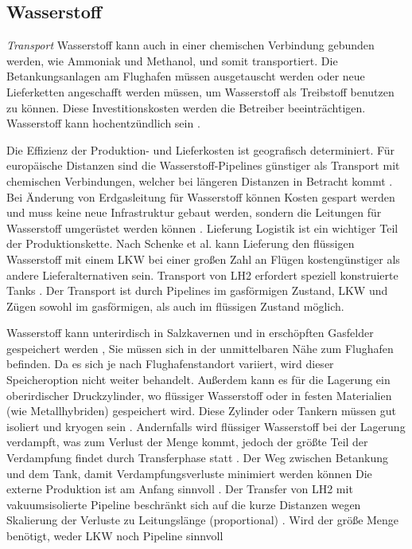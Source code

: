\subsection{Wasserstoff}
\textit{Transport}
Wasserstoff kann auch in einer chemischen Verbindung gebunden werden, wie Ammoniak und Methanol, und somit transportiert.
%
Die Betankungsanlagen am Flughafen müssen ausgetauscht werden oder neue Lieferketten angeschafft werden müssen, 
um Wasserstoff als Treibstoff benutzen zu können.
Diese Investitionskosten werden die Betreiber beeinträchtigen. 
Wasserstoff kann hochentzündlich sein \cite{dalmia2022powering}. %

% 
Die Effizienz der Produktion- und Lieferkosten ist geografisch determiniert. 
Für europäische Distanzen sind die Wasserstoff-Pipelines günstiger als Transport mit chemischen Verbindungen, 
welcher bei längeren Distanzen in Betracht kommt \cite{undertaking2022strategic}. Bei Änderung von Erdgasleitung für Wasserstoff können Kosten gespart
werden und muss keine neue Infrastruktur gebaut werden, sondern die Leitungen für Wasserstoff umgerüstet werden können \cite{undertaking2022strategic}.
Lieferung
Logistik ist ein wichtiger Teil der Produktionskette. Nach Schenke et al. \cite{schenke2024lh2} kann Lieferung den flüssigen Wasserstoff mit einem LKW bei einer großen Zahl an Flügen 
kostengünstiger als andere Lieferalternativen sein. Transport von LH2 erfordert speziell konstruierte Tanks \cite{mulder2019outlook}.
Der Transport ist durch Pipelines im gasförmigen Zustand, LKW und Zügen sowohl im gasförmigen, als auch im flüssigen Zustand möglich. 

Wasserstoff kann unterirdisch in Salzkavernen und in erschöpften Gasfelder gespeichert werden \cite{undertaking2022strategic}, 
Sie müssen sich in der unmittelbaren Nähe zum Flughafen befinden. Da es sich je nach Flughafenstandort variiert, wird dieser Speicheroption nicht weiter behandelt.
Außerdem kann es für die Lagerung ein oberirdischer Druckzylinder, wo flüssiger Wasserstoff oder in festen Materialien (wie Metallhybriden) gespeichert wird.
Diese Zylinder oder Tankern müssen gut isoliert und kryogen sein \cite{undertaking2022strategic}.
Andernfalls wird flüssiger Wasserstoff bei der Lagerung verdampft, was zum Verlust der Menge kommt, 
jedoch der größte Teil der Verdampfung findet durch Transferphase statt \cite{undertaking2022strategic}.
Der Weg zwischen Betankung und dem Tank, damit Verdampfungsverluste minimiert werden können \cite{colpan2022fuel}
Die externe Produktion ist am Anfang sinnvoll \cite{colpan2022fuel}. Der Transfer von LH2 mit vakuumsisolierte Pipeline beschränkt sich auf die kurze Distanzen
wegen Skalierung der Verluste zu Leitungslänge (proportional) \cite{colpan2022fuel}.
Wird der größe Menge benötigt, weder LKW noch Pipeline sinnvoll \cite{colpan2022fuel}


